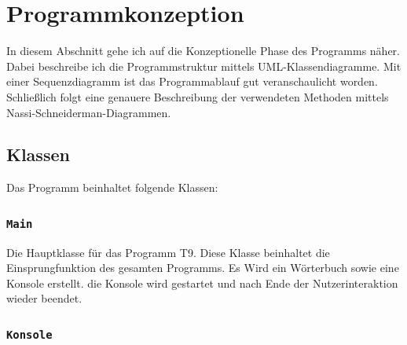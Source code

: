 %

\chapter{Programmkonzeption}

In diesem Abschnitt gehe ich auf die Konzeptionelle Phase des Programms näher. Dabei beschreibe ich die Programmstruktur mittels UML-Klassendiagramme. Mit einer Sequenzdiagramm ist das Programmablauf gut veranschaulicht worden. Schließlich folgt eine genauere Beschreibung der verwendeten Methoden mittels Nassi-Schneiderman-Diagrammen.

\section{Klassen}
Das Programm beinhaltet folgende Klassen:

\subsection{\texttt{Main}}
    
    Die Hauptklasse für das Programm T9.
    Diese Klasse beinhaltet die Einsprungfunktion des gesamten Programms. Es Wird ein Wörterbuch sowie eine Konsole erstellt. die Konsole wird gestartet und nach Ende der Nutzerinteraktion wieder beendet.
    
\subsection{\texttt{Konsole}}
    
